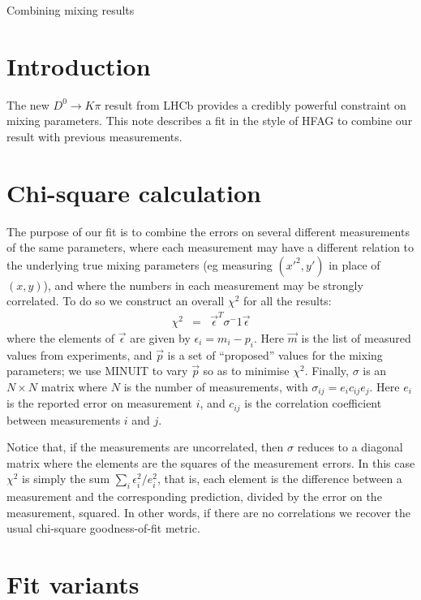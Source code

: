 \documentclass[12pt,pdflatex]{article}
\begin{document}
\begin{center}
{\LARGE Combining mixing results}
\end{center}

\section{Introduction}

The new $D^0\to K\pi$ result from LHCb provides a credibly powerful constraint
on mixing parameters. This note describes a fit in the style of HFAG to combine 
our result with previous measurements. 

\section{Chi-square calculation}

The purpose of our fit is to combine the errors on several different
measurements of the same parameters, where each measurement may have a
different relation to the underlying true mixing parameters (eg measuring
$(x'^2, y')$ in place of $(x, y)$), and where the numbers in each measurement
may be strongly correlated. To do so we construct an overall $\chi^2$ for
all the results:
\begin{eqnarray}
\chi^2 &=& \vec\epsilon^T \sigma^-1 \vec\epsilon
\end{eqnarray}
where the elements of $\vec\epsilon$ are given by
$\epsilon_i = m_i - p_i$. Here $\vec m$ is the list of measured
values from experiments, and $\vec p$ is a set of ``proposed'' values
for the mixing parameters; we use MINUIT to vary $\vec p$ so as
to minimise $\chi^2$. Finally, $\sigma$ is an $N\times N$ matrix where
$N$ is the number of measurements, with $\sigma_{ij} = e_i c_{ij} e_j$.
Here $e_i$ is the reported error on measurement $i$, and $c_{ij}$ is the
correlation coefficient between measurements $i$ and $j$. 

Notice that, if
the measurements are uncorrelated, then $\sigma$ reduces to
a diagonal matrix where the elements are the squares of the measurement
errors. In this case $\chi^2$ is simply the sum $\sum\limits_{i}\epsilon_i^2/e_i^2$,
that is, each element is the difference between a measurement
and the corresponding prediction, divided by the error on the measurement,
squared. In other words, if there are no correlations we recover
the usual chi-square goodness-of-fit metric. 

\section{Fit variants}
\end{document}
